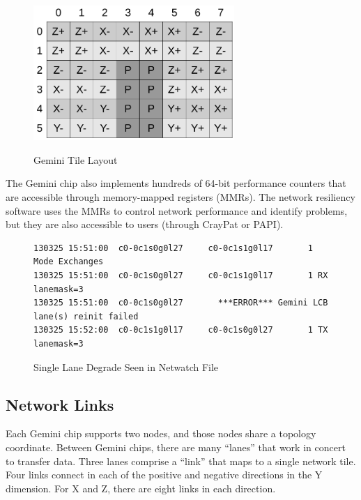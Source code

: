 \documentclass[10pt, conference, compsocconf]{IEEEtran}
\begin{document}
\begin{figure}[h]
  \centering
  \includegraphics[width=3.0in]{figures/gemini_tiles.pdf}\\
  \caption{Gemini Tile Layout}\label{fig:tiles}
\end{figure}

The Gemini chip also implements hundreds of 64-bit performance counters that
are accessible through memory-mapped registers (MMRs).  The network resiliency
software uses the MMRs to control network performance and identify problems,
but they are also accessible to users (through CrayPat or PAPI).

\begin{figure}[ht]
  \begin{verbatim}
130325 15:51:00  c0-0c1s0g0l27     c0-0c1s1g0l17       1 Mode Exchanges                       
130325 15:51:00  c0-0c1s0g0l27     c0-0c1s1g0l17       1 RX lanemask=3                        
130325 15:51:00  c0-0c1s0g0l27       ***ERROR*** Gemini LCB lane(s) reinit failed
130325 15:52:00  c0-0c1s1g0l17     c0-0c1s0g0l27       1 TX lanemask=3                       
  \end{verbatim}
  \caption{Single Lane Degrade Seen in Netwatch File}\label{fig:lanedegrade}
\end{figure}

\subsection{Network Links}

Each Gemini chip supports two nodes, and those nodes share a topology
coordinate.  Between Gemini chips, there are many ``lanes'' that work in
concert to transfer data.  Three lanes comprise a ``link'' that maps to a
single network tile.  Four links connect in each of the positive and negative
directions in the Y dimension.  For X and Z, there are eight links in each
direction.
\end{document}
